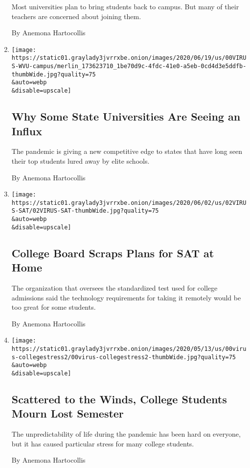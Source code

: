 \begin{enumerate}
  Most universities plan to bring students back to campus. But many of
  their teachers are concerned about joining them.

  By Anemona Hartocollis
\item
  \href{/2020/06/22/us/coronavirus-universities-brain-drain.html}{}

  \texttt{[image: https://static01.graylady3jvrrxbe.onion/images/2020/06/19/us/00VIRUS-WVU-campus/merlin\_173623710\_1be70d9c-4fdc-41e0-a5eb-0cd4d3e5ddfb-thumbWide.jpg?quality=75\\\&auto=webp\\\&disable=upscale]}

  \hypertarget{why-some-state-universities-are-seeing-an-influx}{%
  \subsection{Why Some State Universities Are Seeing an
  Influx}\label{why-some-state-universities-are-seeing-an-influx}}

  The pandemic is giving a new competitive edge to states that have long
  seen their top students lured away by elite schools.

  By Anemona Hartocollis
\item
  \href{/2020/06/02/us/at-home-sat-coronavirus.html}{}

  \texttt{[image: https://static01.graylady3jvrrxbe.onion/images/2020/06/02/us/02VIRUS-SAT/02VIRUS-SAT-thumbWide.jpg?quality=75\\\&auto=webp\\\&disable=upscale]}

  \hypertarget{college-board-scraps-plans-for-sat-at-home}{%
  \subsection{College Board Scraps Plans for SAT at
  Home}\label{college-board-scraps-plans-for-sat-at-home}}

  The organization that oversees the standardized test used for college
  admissions said the technology requirements for taking it remotely
  would be too great for some students.

  By Anemona Hartocollis
\item
  \href{/2020/05/27/us/coronavirus-college-mental-health.html}{}

  \texttt{[image: https://static01.graylady3jvrrxbe.onion/images/2020/05/13/us/00virus-collegestress2/00virus-collegestress2-thumbWide.jpg?quality=75\\\&auto=webp\\\&disable=upscale]}

  \hypertarget{scattered-to-the-winds-college-students-mourn-lost-semester}{%
  \subsection{Scattered to the Winds, College Students Mourn Lost
  Semester}\label{scattered-to-the-winds-college-students-mourn-lost-semester}}

  The unpredictability of life during the pandemic has been hard on
  everyone, but it has caused particular stress for many college
  students.

  By Anemona Hartocollis
\end{enumerate}

